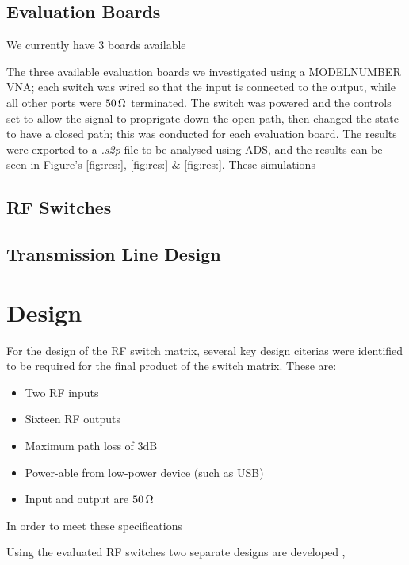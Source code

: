 \documentclass[12pt,openany,a4paper]{book}
\newcommand{\ohm}	{\ensuremath{\rm\,\Omega}}
\begin{document}
\subsection{Evaluation Boards}
We currently have $3$ boards available 



The three available evaluation boards we investigated using a MODELNUMBER VNA; each switch was wired so that the input is connected to the output, while all other ports were $50\ohm$ terminated. The switch was powered and the controls set to allow the signal to proprigate down the open path, then changed the state to have a closed path; this was conducted for each evaluation board. The results were exported to a \textit{.s2p} file to be analysed using ADS, and the results can be seen in Figure's \ref{fig:res:}, \ref{fig:res:} \& \ref{fig:res:}. 
These simulations 



\subsection{RF Switches}



\subsection{Transmission Line Design}








\section{Design}
For the design of the RF switch matrix, several key design citerias were identified to be required for the final product of the switch matrix. These are:
\begin{itemize}
	\setlength\itemsep{-0.5em}
	\item Two RF inputs
	\item Sixteen RF outputs
	\item Maximum path loss of $3$dB
	\item Power-able from low-power device (such as USB)
	\item Input and output are $50\ohm$
\end{itemize}
In order to meet these specifications 

Using the evaluated RF switches two separate designs are developed , 
\end{document}
